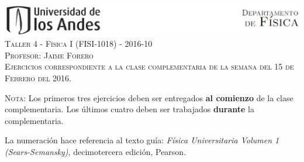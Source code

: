 \documentclass[letterpaper,10pt,onecolumn]{article}
\begin{document}
\begin{center}


\includegraphics[width=490pt]{header.png}\\[0.5cm]

\textsc{\LARGE Taller 4 - F\'isica I (FISI-1018) - 2016-10}\\[0.5cm]

\textsc{\Large{Profesor: Jaime Forero}} \\[0.5cm]

\noindent\textsc{Ejercicios correspondiente a la clase complementaria de la semana del 15 de Febrero del 2016.}\\[0.5cm]
\end{center}

\noindent\textsc{Nota:} 
Los primeros tres ejercicios deben ser
entregados {\bf al comienzo} de la clase complementaria. Los \'ultimos
cuatro deben ser trabajados {\bf durante} la complementaria. 

La numeraci\'on
hace referencia al texto gu\'ia: \textit{F\'isica Universitaria Volumen
  1 (Sears-Semansky)}, decimotercera edici\'on, Pearson.
\end{document}
